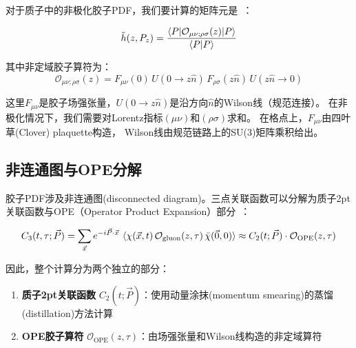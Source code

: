 \documentclass[12pt,a4paper]{ctexart}
\begin{document}
对于质子中的非极化胶子PDF，我们要计算的矩阵元是~\cite{Note_of_gluon_PDFs,First_Nucleon_Gluon_PDF}：

\begin{physbox}
\begin{equation}
    \tilde{h}(z, P_z) = \frac{\braket{P | \mathcal{O}_{\mu\nu;\rho\sigma}(z) | P}}{\braket{P|P}}
    \label{eq:matrix_element}
\end{equation}

其中非定域胶子算符为：
\begin{equation}
    \mathcal{O}_{\mu\nu;\rho\sigma}(z) = F_{\mu\nu}(0) \, U(0 \to z\hat{n}) \, F_{\rho\sigma}(z\hat{n}) \, U(z\hat{n} \to 0)
    \label{eq:gluon_operator}
\end{equation}
\end{physbox}

这里$F_{\mu\nu}$是胶子场强张量，$U(0\to z\hat{n})$是沿方向$\hat{n}$的Wilson线（规范连接）。
在非极化情况下，我们需要对Lorentz指标$(\mu\nu)$和$(\rho\sigma)$求和。
在格点上，$F_{\mu\nu}$由四叶草(Clover) plaquette构造，
Wilson线由规范链路上的SU(3)矩阵乘积给出。

\subsection{非连通图与OPE分解}

胶子PDF涉及非连通图(disconnected diagram)。三点关联函数可以分解为质子2pt关联函数与OPE（Operator Product Expansion）部分~\cite{Note_of_gluon_PDFs}：

\begin{physbox}
\begin{equation}
    C_3(t, \tau; \vec{P}) = \sum_{\vec{x}} e^{-i\vec{P}\cdot\vec{x}} \,
    \braket{ \chi(\vec{x}, t) \, \mathcal{O}_{\text{gluon}}(z, \tau) \, \bar{\chi}(\vec{0}, 0) }
    \approx C_2(t; \vec{P}) \cdot \mathcal{O}_{\text{OPE}}(z, \tau)
    \label{eq:three_pt_decomp}
\end{equation}
\end{physbox}

因此，整个计算分为两个独立的部分：
\begin{enumerate}[label=(\arabic*)]
    \item \textbf{质子2pt关联函数} $C_2(t; \vec{P})$：使用动量涂抹(momentum smearing)的蒸馏(distillation)方法计算
    \item \textbf{OPE胶子算符} $\mathcal{O}_{\text{OPE}}(z, \tau)$：由场强张量和Wilson线构造的非定域算符
\end{enumerate}
\end{document}
